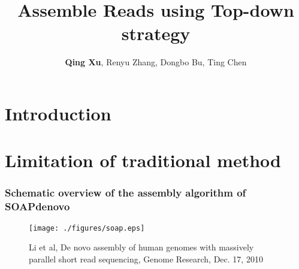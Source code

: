 \documentclass[mathserif]{beamer}
\title{Assemble Reads using Top-down strategy}
\author{ {\bf Qing Xu}, Renyu Zhang, Dongbo Bu, Ting Chen}
\institute{Institute of Computing Technology, Chinese Academy of Sciences}
\begin{document}
	\begin{frame}
		\titlepage
	\end{frame}
\section{Introduction}
\section{Limitation of traditional method}

\begin{frame}
		\frametitle{Schematic overview of the assembly algorithm of SOAPdenovo}
			\begin{figure}
				\centering
				\texttt{[image: ./figures/soap.eps]}
				\caption{\tiny Li et al, De novo assembly of human genomes with massively parallel short read sequencing, Genome Research, Dec. 17, 2010}
			\end{figure}
	\end{frame}
	
\end{document}
